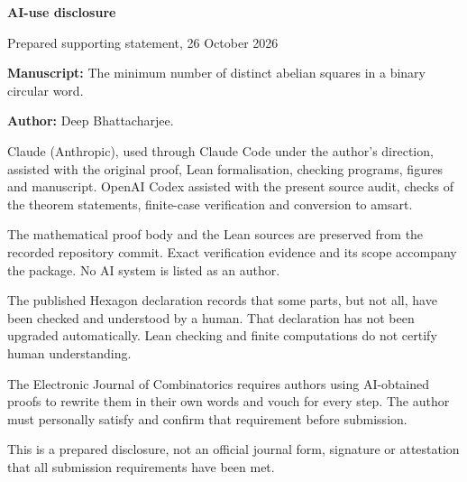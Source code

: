 \documentclass[11pt]{article}
\begin{document}
{\Large\bfseries AI-use disclosure}\par
Prepared supporting statement, 26 October 2026

\textbf{Manuscript:} The minimum number of distinct abelian squares in a binary circular word.

\textbf{Author:} Deep Bhattacharjee.

Claude (Anthropic), used through Claude Code under the author's direction, assisted with the original proof, Lean formalisation, checking programs, figures and manuscript. OpenAI Codex assisted with the present source audit, checks of the theorem statements, finite-case verification and conversion to amsart.

The mathematical proof body and the Lean sources are preserved from the recorded repository commit. Exact verification evidence and its scope accompany the package. No AI system is listed as an author.

The published Hexagon declaration records that some parts, but not all, have been checked and understood by a human. That declaration has not been upgraded automatically. Lean checking and finite computations do not certify human understanding.

The Electronic Journal of Combinatorics requires authors using AI-obtained proofs to rewrite them in their own words and vouch for every step. The author must personally satisfy and confirm that requirement before submission.

This is a prepared disclosure, not an official journal form, signature or attestation that all submission requirements have been met.
\end{document}
